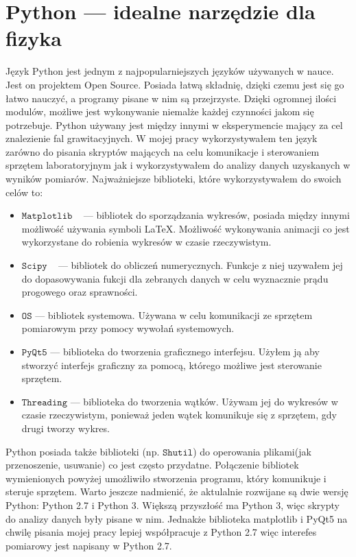 \documentclass[a4paper, portrait,12pt]{mwrep}
\begin{document}
\section{Python --- idealne narzędzie dla fizyka}
Język Python jest jednym z najpopularniejszych języków używanych w nauce. Jest on projektem Open Source. Posiada łatwą składnię, dzięki czemu jest się go łatwo nauczyć, a programy pisane w nim są przejrzyste. Dzięki ogromnej ilości modulów, możliwe jest wykonywanie niemalże każdej czynności jakom się potrzebuje. Python używany jest między innymi w eksperymencie mający za cel znalezienie fal grawitacyjnych. W mojej pracy wykorzystywałem ten język zarówno do pisania skryptów mających na celu komunikacje i sterowaniem sprzętem laboratoryjnym jak i  wykorzystywałem do analizy danych uzyskanych w wyników pomiarów.
Najważniejsze biblioteki, które wykorzystywałem do swoich celów to:
\begin{itemize}
\item $\mathtt{Matplotlib}$ ~\cite{matplotlib_book} --- bibliotek do sporządzania wykresów, posiada między innymi możliwość używania symboli \LaTeX. Możliwość wykonywania animacji co jest wykorzystane do robienia wykresów w czasie rzeczywistym.
\item $\mathtt{Scipy}$ ~\cite{SciPy_book} --- bibliotek do obliczeń numerycznych. Funkcje z niej uzywałem jej do dopasowywania fukcji dla zebranych danych w celu wyznacznie prądu progowego oraz sprawności.
\item $\mathtt{OS}$ --- bibliotek systemowa. Używana w celu komunikacji ze sprzętem pomiarowym przy pomocy wywołań systemowych.
\item $\mathtt{PyQt5}$ --- biblioteka do tworzenia graficznego interfejsu. Użyłem ją aby stworzyć interfejs graficzny za pomocą, którego możliwe jest sterowanie sprzętem.
\item $\mathtt{Threading}$ --- biblioteka do tworzenia wątków. Używam jej do wykresów w czasie rzeczywistym, ponieważ jeden wątek komunikuje się z sprzętem, gdy drugi tworzy wykres. 
\end{itemize} 
Python posiada także biblioteki (np. $\mathtt{Shutil}$) do operowania plikami(jak przenoszenie, usuwanie) co jest często przydatne. Połączenie bibliotek wymienionych powyżej umożliwiło stworzenia programu, który komunikuje i steruje sprzętem. Warto jeszcze nadmienić, że aktulalnie rozwijane są dwie wersję Python: Python 2.7 i Python 3. Większą przyszłość ma Python 3, więc skrypty do analizy danych były pisane w nim. Jednakże biblioteka matplotlib i PyQt5 na chwilę pisania mojej pracy lepiej współpracuje z Python 2.7 więc interefes pomiarowy jest napisany w Python 2.7.   
\end{document}
